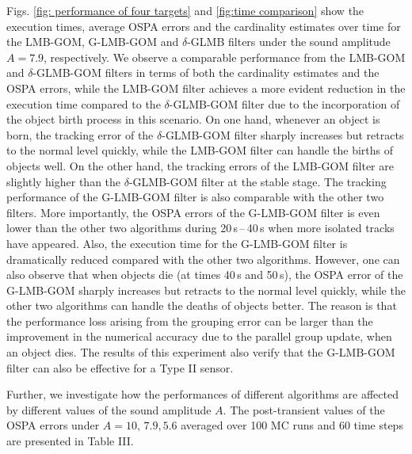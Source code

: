 \documentclass[journal]{IEEEtran}
\begin{document}
{Figs. \ref{fig: performance of four targets} and \ref{fig:time comparison} show the execution times, average OSPA errors and the cardinality estimates over time for the LMB-GOM, G-LMB-GOM and $\delta$-GLMB filters under the sound amplitude $A=7.9$, respectively. We observe a comparable performance from the LMB-GOM and $\delta$-GLMB-GOM filters  in terms of both the cardinality estimates and the OSPA errors, while the LMB-GOM filter achieves a more evident reduction in the execution time compared to  the $\delta$-GLMB-GOM filter  due to the incorporation of the object birth process in this scenario. On one hand, whenever an object is born, the tracking error of the $\delta$-GLMB-GOM filter  sharply increases but retracts to the normal level quickly, while the LMB-GOM filter can handle the births of objects well.  On the other hand, the tracking errors of the LMB-GOM filter are slightly higher than the $\delta$-GLMB-GOM filter at the stable stage.   The tracking performance of the G-LMB-GOM filter is also comparable with the other two filters. More importantly, the OSPA errors  of the G-LMB-GOM filter is even lower than the other two algorithms during 20\,s\,--\,40\,s when more isolated  tracks have appeared. Also, the execution time for the G-LMB-GOM filter is dramatically reduced compared with the other two algorithms. However, one can also observe that when objects die (at times 40\,s and 50\,s), the OSPA error of the G-LMB-GOM sharply increases but retracts to the normal level quickly, while the other two algorithms can handle the deaths of objects better. 
The reason is that 
the performance loss arising from the grouping error can be larger than the improvement in the numerical accuracy due to the parallel group update, when an object dies.
The results of this experiment also verify that the G-LMB-GOM filter can also be effective for a Type II sensor.

Further,  we investigate how the performances of different algorithms are affected by  different values of the sound amplitude $A$. The  post-transient values of the OSPA errors under $A=10,\,7.9, 5.6$ averaged over 100 MC runs and 60 time steps are presented in Table III.



 

}
\end{document}
